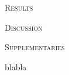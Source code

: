 \documentclass[12pt,letterpaper]{article}
\renewcommand{\section}[1]{%
\bigskip
\begin{center}
\begin{Large}
\normalfont\scshape #1
\medskip
\end{Large}
\end{center}}
\begin{document}
\section{Results}

\section{Discussion}


\section{Supplementaries}
\label{supplementaries}
blabla


\end{document}
